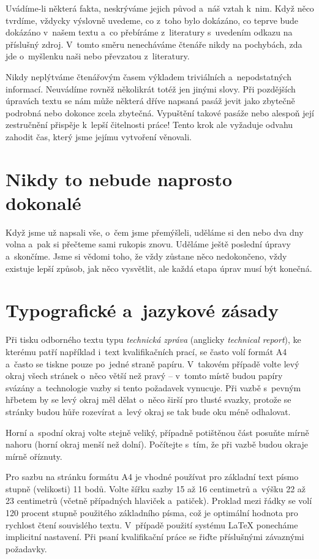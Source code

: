 Uvádíme-li některá fakta, neskrýváme jejich původ a~náš vztah k~nim. Když něco tvrdíme, vždycky výslovně uvedeme, co z~toho bylo dokázáno, co teprve bude dokázáno v~našem textu a~co přebíráme z~literatury s~uvedením odkazu na příslušný zdroj. V~tomto směru nenecháváme čtenáře nikdy na pochybách, zda jde o~myšlenku naši nebo převzatou z~literatury.

Nikdy neplýtváme čtenářovým časem výkladem triviálních a~nepodstatných informací. Neuvádíme rovněž několikrát totéž jen jinými slovy. Při pozdějších úpravách textu se nám může některá dříve napsaná pasáž jevit jako zbytečně podrobná nebo dokonce zcela zbytečná. Vypuštění takové pasáže nebo alespoň její zestručnění přispěje k~lepší čitelnosti práce! Tento krok ale vyžaduje odvahu zahodit čas, který jsme jejímu vytvoření věnovali. 


\chapter{Nikdy to nebude naprosto dokonalé}
Když jsme už napsali vše, o~čem jsme přemýšleli, uděláme si den nebo dva dny volna a~pak si přečteme sami rukopis znovu. Uděláme ještě poslední úpravy a~skončíme. Jsme si vědomi toho, že vždy zůstane něco nedokončeno, vždy existuje lepší způsob, jak něco vysvětlit, ale každá etapa úprav musí být konečná.


\chapter{Typografické a~jazykové zásady}
Při tisku odborného textu typu {\it technická zpráva} (anglicky {\it technical report}), ke kterému patří například i~text kvalifikačních prací, se často volí formát A4 a~často se tiskne pouze po~jedné straně papíru. V~takovém případě volte levý okraj všech stránek o~něco větší než pravý -- v~tomto místě budou papíry svázány a~technologie vazby si tento požadavek vynucuje. Při vazbě s~pevným hřbetem by se levý okraj měl dělat o~něco širší pro tlusté svazky, protože se stránky budou hůře rozevírat a~levý okraj se tak bude oku méně odhalovat.

Horní a~spodní okraj volte stejně veliký, případně potištěnou část posuňte mírně nahoru (horní okraj menší než dolní). Počítejte s~tím, že při vazbě budou okraje mírně oříznuty.

Pro sazbu na stránku formátu A4 je vhodné používat pro základní text písmo stupně (velikosti) 11 bodů. Volte šířku sazby 15 až 16 centimetrů a~výšku 22 až 23 centimetrů (včetně případných hlaviček a~patiček). Proklad mezi řádky se volí 120 procent stupně použitého základního písma, což je optimální hodnota pro rychlost čtení souvislého textu. V~případě použití systému LaTeX ponecháme implicitní nastavení. Při psaní kvalifikační práce se řiďte příslušnými závaznými požadavky.

